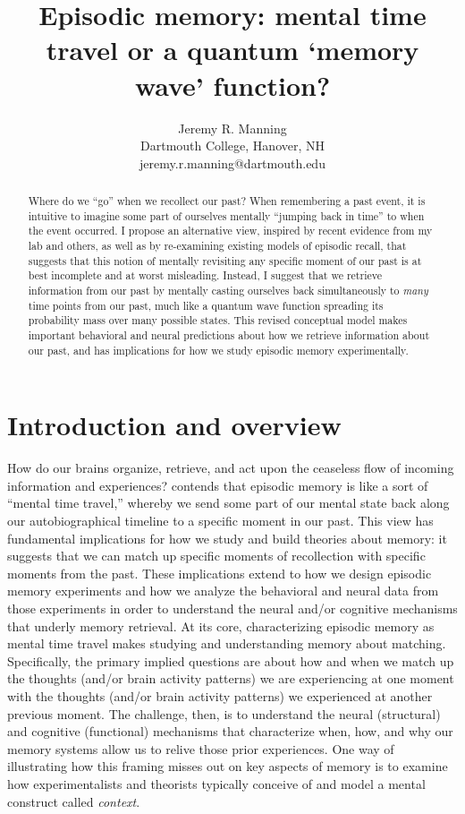 \documentclass{article}
\title{Episodic memory: mental time travel or a quantum `memory wave' function?}
\author{Jeremy R. Manning\\Dartmouth College, Hanover, NH\\jeremy.r.manning@dartmouth.edu}
\begin{document}
\maketitle

\begin{abstract}
Where do we ``go'' when we recollect our past?  When remembering a past event, it is intuitive to imagine some part of ourselves mentally ``jumping back in time'' to when the event occurred. I propose an alternative view, inspired by recent evidence from my lab and others, as well as by re-examining existing models of episodic recall, that suggests that this notion of mentally revisiting any specific moment of our past is at best incomplete and at worst misleading.  Instead, I suggest that we retrieve information from our past by mentally casting ourselves back simultaneously to \textit{many} time points from our past, much like a quantum wave function spreading its probability mass over many possible states.  This revised conceptual model makes important behavioral and neural predictions about how we retrieve information about our past, and has implications for how we study episodic memory experimentally.
\end{abstract}

\section*{Introduction and overview}
How do our brains organize, retrieve, and act upon the ceaseless flow of incoming information and experiences?  \cite{Tulv83} contends that episodic memory is like a sort of ``mental time travel,'' whereby we send some part of our mental state back along our autobiographical timeline to a specific moment in our past.  This view has fundamental implications for how we study and build theories about memory: it suggests that we can match up specific moments of recollection with specific moments from the past.  These implications extend to how we design episodic memory experiments and how we analyze the behavioral and neural data from those experiments in order to understand the neural and/or cognitive mechanisms that underly memory retrieval.  At its core, characterizing episodic memory as mental time travel makes studying and understanding memory about matching.  Specifically, the primary implied questions are about how and when we match up the thoughts (and/or brain activity patterns) we are experiencing at one moment with the thoughts (and/or brain activity patterns) we experienced at another previous moment.  The challenge, then, is to understand the neural (structural) and cognitive (functional) mechanisms that characterize when, how, and why our memory systems allow us to relive those prior experiences.  One way of illustrating how this framing misses out on key aspects of memory is to examine how experimentalists and theorists typically conceive of and model a mental construct called \textit{context}.
\end{document}
